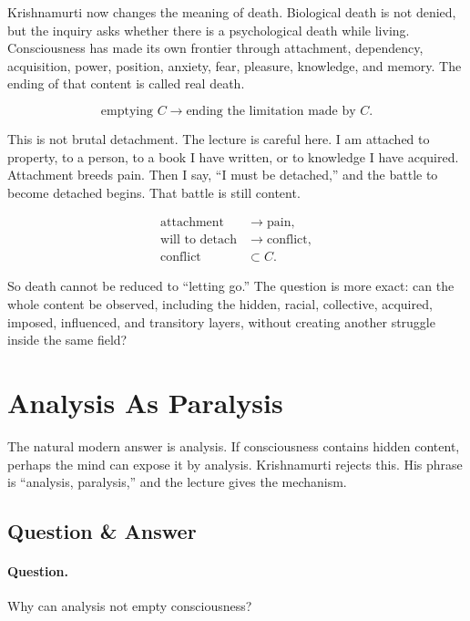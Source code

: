\documentclass[11pt,oneside]{book}
\begin{document}
Krishnamurti now changes the meaning of death. Biological death is not denied, but the inquiry asks whether there is a psychological death while living. Consciousness has made its own frontier through attachment, dependency, acquisition, power, position, anxiety, fear, pleasure, knowledge, and memory. The ending of that content is called real death.

\begin{equation}
\text{emptying } C
\longrightarrow
\text{ending the limitation made by } C.
\end{equation}

This is not brutal detachment. The lecture is careful here. I am attached to property, to a person, to a book I have written, or to knowledge I have acquired. Attachment breeds pain. Then I say, ``I must be detached,'' and the battle to become detached begins. That battle is still content.

\begin{align}
\text{attachment} &\longrightarrow \text{pain},\\
\text{will to detach} &\longrightarrow \text{conflict},\\
\text{conflict} &\subset C.
\end{align}

So death cannot be reduced to ``letting go.'' The question is more exact: can the whole content be observed, including the hidden, racial, collective, acquired, imposed, influenced, and transitory layers, without creating another struggle inside the same field?

\section{Analysis As Paralysis}

The natural modern answer is analysis. If consciousness contains hidden content, perhaps the mind can expose it by analysis. Krishnamurti rejects this. His phrase is ``analysis, paralysis,'' and the lecture gives the mechanism.

\subsection{Question \& Answer}

\paragraph{Question.}
Why can analysis not empty consciousness?
\end{document}
